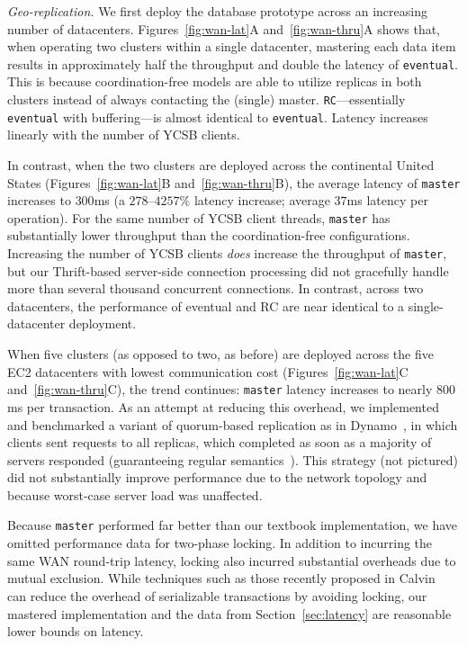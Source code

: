 \vspace{.5em}\noindent\textit{Geo-replication.} We first deploy the
database prototype across an increasing number of
datacenters. Figures~\ref{fig:wan-lat}A and~\ref{fig:wan-thru}A shows
that, when operating two clusters within a single datacenter,
mastering each data item results in approximately half the throughput
and double the latency of \texttt{eventual}. This is because
coordination-free models are able to utilize replicas in both clusters
instead of always contacting the (single)
master. \texttt{RC}---essentially \texttt{eventual} with
buffering---is almost identical to \texttt{eventual}. Latency
increases linearly with the number of YCSB clients.

In contrast, when the two clusters are deployed across the continental
United States (Figures~\ref{fig:wan-lat}B and~\ref{fig:wan-thru}B), the average latency of
\texttt{master} increases to $300$ms (a $278$--$4257\%$ latency
increase; average $37$ms latency per operation). For the same number
of YCSB client threads, \texttt{master} has substantially lower
throughput than the coordination-free configurations. Increasing the number of YCSB
clients \textit{does} increase the throughput of \texttt{master}, but
our Thrift-based server-side connection processing did not gracefully
handle more than several thousand concurrent connections. In contrast,
across two datacenters, the performance of eventual and RC are
near identical to a single-datacenter deployment.

\FloatBarrier

When five clusters (as opposed to two, as before) are deployed across
the five EC2 datacenters with lowest communication cost
(Figures~\ref{fig:wan-lat}C and~\ref{fig:wan-thru}C), the trend continues: \texttt{master}
latency increases to nearly $800$ms per transaction. As an attempt at
reducing this overhead, we implemented and benchmarked a variant of
quorum-based replication as in Dynamo~\cite{dynamo}, in which clients
sent requests to all replicas, which completed as soon as a majority
of servers responded (guaranteeing regular
semantics~\cite{herlihy-art}). This strategy (not pictured) did not
substantially improve performance due to the network topology and
because worst-case server load was unaffected.

Because \texttt{master} performed {far} better than our
textbook implementation, we have omitted performance data for
two-phase locking. In addition to incurring the same WAN round-trip
latency, locking also incurred substantial overheads due to mutual
exclusion. While techniques such as those recently proposed in
Calvin~\cite{calvin} can reduce the overhead of serializable
transactions by avoiding locking, our mastered implementation and the
data from Section~\ref{sec:latency} are reasonable lower bounds on
latency.


